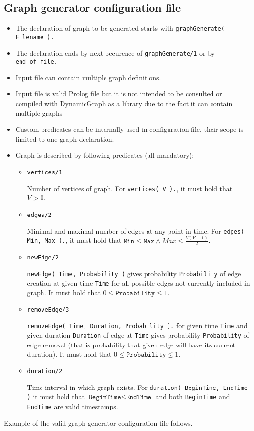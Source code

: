 \documentclass[11pt, a4paper,draft]{article}
\newcommand{\pl}[1]{\texttt{#1}} %
\theoremstyle{plain}
\theoremstyle{definition}
\theoremstyle{remark}
\begin{document}
\subsection{Graph generator configuration file}
\label{sec:files-generator}

\begin{itemize}
    \item The declaration of graph to be generated starts with \pl{graphGenerate( Filename ).}
    \item The declaration ends by next occurence of \pl{graphGenerate/1} or by
        \pl{end\_of\_file.}
    \item Input file can contain multiple graph definitions.
    \item Input file is valid Prolog file but it is not intended to be consulted or
        compiled with DynamicGraph as a library due to the fact it can contain multiple
        graphs.
    \item Custom predicates can be internally used in configuration file, their scope
        is limited to one graph declaration.
    \item Graph is described by following predicates (all mandatory): 
        \begin{itemize}
            \item \pl{vertices/1}

                Number of vertices of graph. For \pl{vertices( V ).}, it must hold that $V > 0$.
            \item \pl{edges/2}

                Minimal and maximal number of edges at any point in time.
                For \pl{edges( Min, Max ).}, it must hold that
                $\pl{Min} \le \pl{Max} \land Max \le \frac{ V(V-1)}{2}$.
            \item \pl{newEdge/2}

                \pl{newEdge( Time, Probability )} gives probability \pl{Probability} of
                edge creation at given time \pl{Time} for all possible edges not currently
                included in graph. It must hold that $0 \le \pl{Probability} \le 1$.
            \item \pl{removeEdge/3}
                
                \pl{removeEdge( Time, Duration, Probability ).} for given time \pl{Time}
                and given duration \pl{Duration} of edge at \pl{Time} gives
                probability \pl{Probability} of edge removal (that is probability
                that given edge will have its current duration).
                It must hold that $0 \le \pl{Probability} \le 1$.
            \item \pl{duration/2}

                Time interval in which graph exists. For \pl{duration( BeginTime, EndTime )}
                it must hold that  $\pl{BeginTime} \le \pl{EndTime}$ and both
                \pl{BeginTime} and \pl{EndTime} are valid timestamps.
        \end{itemize}

\end{itemize}
Example of the valid graph generator configuration file follows.
\end{document}
